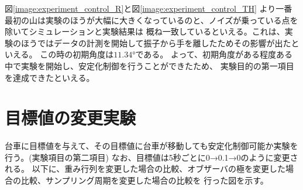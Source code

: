 	図\ref{image:experiment_control_R}と図\ref{image:experiment_control_TH}
	より一番最初の山は実験のほうが大幅に大きくなっているのと、ノイズが乗っている点を除いてシミュレーションと実験結果は
	概ね一致しているといえる。これは、実験のほうではデータの計測を開始して振子から手を離したためその影響が出たといえる。
	この時の初期角度は$11.34°$である。%
	よって、初期角度がある程度ある中で実験を開始し、安定化制御を行うことができたため、
	実験目的の第一項目を達成できたといえる。
	
	
	
\newpage
\section{目標値の変更実験}
	台車に目標値を与えて、その目標値に台車が移動しても安定化制御可能か実験を行う。(実験項目の第二項目)
	なお、目標値は5秒ごとに0→0.1→0のように変更される。
	以下に、重み行列を変更した場合の比較、オブザーバの極を変更した場合の比較、サンプリング周期を変更した場合の比較を
	行った図を示す。
	\par
